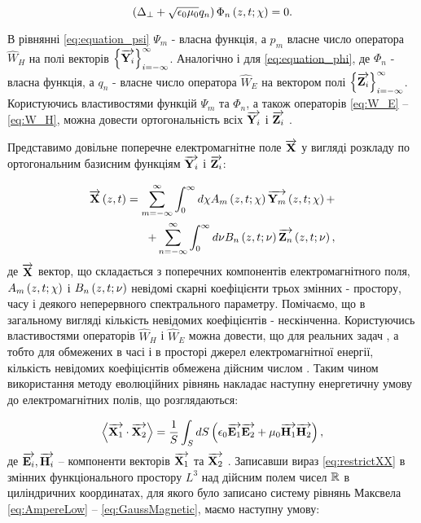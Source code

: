 \begin{equation} \label{eq:equation_phi}
\left( \Delta_\perp + \sqrt{\epsilon_0 \mu_0} q_n \right)
\Phi_n \left( z,t;\chi \right) = 0.
\end{equation}

В рівнянні \eqref{eq:equation_psi} $ \Psi_m $ - власна функція, а $ p_m $ 
власне число оператора $ \widehat{W}_H $ на полі векторів 
$ \left\{ \overrightarrow{\mathbf Y_i} \right\}_{i=-\infty}^\infty $. Аналогічно і для 
\eqref{eq:equation_phi}, де $ \Phi_n $ - власна функція, а $ q_n $ - власне
число оператора $ \widehat{W}_E $ на вектором полі
$ \left\{ \overrightarrow{\mathbf Z_i} \right\}_{i=-\infty}^\infty $. Користуючись 
властивостями функцій $ \Psi_m $ та $ \Phi_n $, а також операторів 
\eqref{eq:W_E} -- \eqref{eq:W_H}, можна довести ортогональність всіх 
$ \overrightarrow{\mathbf Y_i} $ і $ \overrightarrow{\mathbf Z_i} $ \cite{imp:Tretyakov1994}.

Представимо довільне поперечне електромагнітне поле $ \overrightarrow{\mathbf X} $ у вигляді 
розкладу по ортогональним базисним функціям $ \overrightarrow{\mathbf Y_i} $ і $ \overrightarrow{\mathbf Z_i} $:

\begin{equation} \begin{aligned} \label{eq:modalYZ}
\overrightarrow{\mathbf X} \left( z,t \right) = 
\sum_{m=-\infty}^\infty \int_0^\infty d \chi 
A_m \left( z,t;\chi \right) \overrightarrow{\mathbf Y_m} \left( z,t;\chi \right) + \\
+ \sum_{n=-\infty}^\infty \int_0^\infty d \nu 
B_n \left( z,t;\nu \right) \overrightarrow{\mathbf Z_n} \left( z,t;\nu \right),
\end{aligned} \end{equation}
%
де $ \overrightarrow{\mathbf X} $ вектор, що складається з поперечних компонентів 
електромагнітного поля, $ A_m \left( z,t;\chi \right) $ і $ B_n \left( z,t;\nu \right) $ 
невідомі скарні коефіцієнти трьох змінних - простору, часу і деякого 
неперервного спектрального параметру. Помічаємо, що в загальному вигляді 
кількість невідомих коефіцієнтів - нескінченна. Користуючись властивостями 
операторів $ \widehat{W}_H $ і $ \widehat{W}_E $ можна довести, що для 
реальних задач \cite{imp:Legenkiy2010}, а тобто для обмежених в часі і в 
просторі джерел електромагнітної енергії, кількість невідомих коефіцієнтів 
обмежена дійсним числом \cite{imp:Tretyakov2004, imp:Tretyakov2010}. Таким
чином використання методу еволюційних рівнянь накладає наступну енергетичну 
умову до електромагнітних полів, що розглядаються:

\begin{equation} \label{eq:restrictXX}
\left< \overrightarrow{\mathbf X_1} \cdot \overrightarrow{\mathbf X_2} \right> = \frac{1}{S} \int_{S} dS
\left( \epsilon_0 \overrightarrow{\mathbf E_1} \overrightarrow{\mathbf E_2} + \mu_0 \overrightarrow{\mathbf H_1} \overrightarrow{\mathbf H_2} \right),
\end{equation}
%
де $ \overrightarrow{\mathbf E_i}, \overrightarrow{\mathbf H_i} $ -- компоненти векторів $ \overrightarrow{\mathbf X_1} $ та 
$ \overrightarrow{\mathbf X_2} $ . Записавши вираз \eqref{eq:restrictXX} в змінних 
функціонального простору $ L^3 $ над дійсним полем чисел $ \mathbb{R} $ в 
циліндричних координатах, для якого було записано систему рівнянь Максвела 
\eqref{eq:AmpereLow} -- \eqref{eq:GaussMagnetic}, маємо наступну умову:

